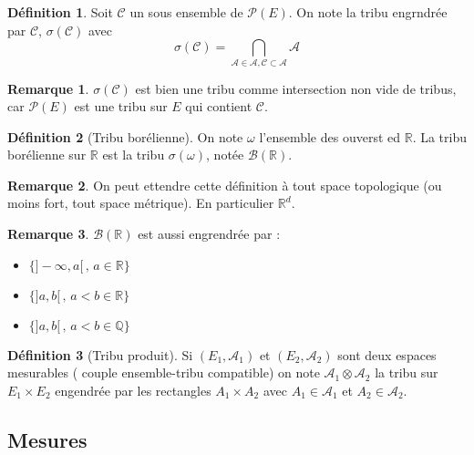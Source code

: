 \documentclass{article}
\theoremstyle{definition}
\newtheorem{definition}{Définition}
\theoremstyle{definition}
\theoremstyle{definition}
\theoremstyle{definition}
\theoremstyle{plain}
\theoremstyle{definition}
\newtheorem{remarque}{Remarque}
\begin{document}
\begin{definition}
	Soit $\mathscr{C}$ un sous ensemble de $\mathscr{P}(E)$. On note la tribu
	engrndrée par $\mathscr{C}$, $\sigma(\mathscr{C})$ avec
	\begin{equation*}
		\sigma(\mathscr{C}) = \bigcap\limits_{\mathscr{A} \in \mathscr{A}, \mathscr{C} \subset \mathscr{A}} \mathscr{A}
	\end{equation*}
\end{definition}

\begin{remarque}
	$\sigma(\mathscr{C})$ est bien une tribu comme intersection non vide de tribus,
	car $\mathscr{P}(E)$ est une tribu sur $E$ qui contient $\mathscr{C}$.
\end{remarque}

\begin{definition}[Tribu borélienne]
	On note $\omega$ l'ensemble des ouverst ed $\mathbb{R}$. La tribu borélienne sur
	$\mathbb{R}$ est la tribu $\sigma(\omega)$, notée $\mathscr{B}(\mathbb{R})$.
\end{definition}


\begin{remarque}
	On peut ettendre cette définition à tout space topologique (ou moins fort, tout space métrique). En particulier
	$\mathbb{R}^d$.
\end{remarque}

\begin{remarque}
	$\mathscr{B}(\mathbb{R})$ est aussi engrendrée par :
	\begin{itemize}
		\item $\{ ]-\infty, a[\,,\, a \in \mathbb{R} \}$
		\item $\{ ]a, b[\,,\, a < b \in \mathbb{R} \}$
		\item $\{ ]a, b[\,,\, a < b \in \mathbb{Q} \}$
	\end{itemize}
\end{remarque}


\begin{definition}[Tribu produit]
	Si $(E_1, \mathscr{A}_1)$ et $(E_2, \mathscr{A}_2)$ sont deux espaces mesurables ( couple ensemble-tribu compatible)
	on note $\mathscr{A}_1 \otimes \mathscr{A}_2$ la tribu sur $E_1 \times E_2$ engendrée
	par les rectangles $A_1 \times A_2$ avec $A_1 \in \mathscr{A}_1$ et $A_2 \in \mathscr{A}_2$.

\end{definition}


\subsection{Mesures}
\end{document}
